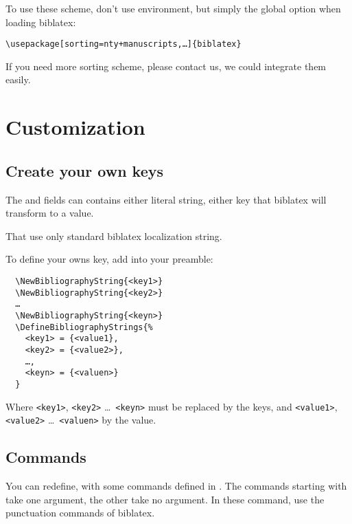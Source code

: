 \documentclass{ltxdockit}[2011/03/25]
\newcommand{\biblatex}{biblatex\xspace}
\newcommand{\meta}[1]{\texttt{<#1>}}
\begin{document}
To use these scheme, don't use  environment, but simply the global option when loading \biblatex:
\begin{verbatim}
\usepackage[sorting=nty+manuscripts,…]{biblatex}
\end{verbatim}

If you need more sorting scheme, please contact us, we could integrate them easily.
 
\section{Customization}

\subsection{Create your own keys}\label{key-definition}

The  and  fields can contains either literal string, either key that \biblatex will transform to a value.

That use only standard \biblatex  localization string.
 
To define your owns key, add into your preamble:
\begin{verbatim}
  \NewBibliographyString{<key1>}
  \NewBibliographyString{<key2>}
  …
  \NewBibliographyString{<keyn>}
  \DefineBibliographyStrings{%
    <key1> = {<value1},
    <key2> = {<value2>},
    …,
    <keyn> = {<valuen>}
  }

\end{verbatim}
 
Where \meta{key1}, \meta{key2} \ldots\ \meta{keyn} must be replaced by the keys, and \meta{value1}, \meta{value2} \ldots\ \meta{valuen} by the value.
 

\subsection{Commands}

You can redefine, with  some commands defined in . The commands starting with  take one argument, the other take no argument. In these command, use the punctuation commands of \biblatex.
\end{document}
